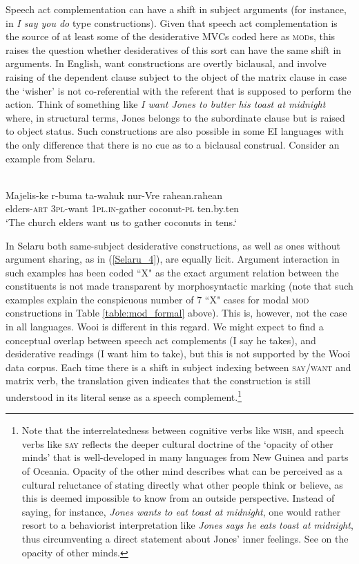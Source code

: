 Speech act complementation can have a shift in subject arguments (for instance, in \textit{I say you do} type constructions). Given that speech act complementation is the source of at least some of the desiderative MVCs coded here as \textsc{mod}s, this raises the question whether desideratives of this sort can have the same shift in arguments. In English, want constructions are overtly biclausal, and involve raising of the dependent clause subject to the object of the matrix clause in case the `wisher' is not co-referential with the referent that is supposed to perform the action. Think of something like \textit{I want Jones to butter his toast at midnight} where, in structural terms, Jones belongs to the subordinate clause but is raised to object status. Such constructions are also possible in some EI languages with the only difference that there is no cue as to a biclausal construal. Consider an example from Selaru.

\ea \label{Selaru_4}
\\
\gll Majelis-ke r-buma ta-wahuk nur-Vre rahean.rahean \\
elders-\textsc{art} 3\textsc{pl}-want 1\textsc{pl}.\textsc{in}-gather coconut-\textsc{pl} ten.by.ten \\
\glft `The church elders want us to gather coconuts in tens.‘\\ 
\z

In Selaru both same-subject desiderative constructions, as well as ones without argument sharing, as in (\ref{Selaru_4}), are equally licit. Argument interaction in such examples has been coded ``X" as the exact argument relation between the constituents is not made transparent by morphosyntactic marking (note that such examples explain the conspicuous number of 7 ``X" cases for modal \textsc{mod} constructions in Table \ref{table:mod_formal} above). This is, however, not the case in all languages. Wooi is different in this regard. We might expect to find a conceptual overlap between speech act complements (I say he takes), and desiderative readings (I want him to take), but this is not supported by the Wooi data corpus. Each time there is a shift in subject indexing between \textsc{say}/\textsc{want} and matrix verb, the translation given indicates that the construction is still understood in its literal sense as a speech complement.\footnote{Note that the interrelatedness between cognitive verbs like \textsc{wish}, and speech verbs like \textsc{say} reflects the deeper cultural doctrine of the `opacity of other minds' that is well-developed in many languages from New Guinea and parts of Oceania. Opacity of the other mind describes what can be perceived as a cultural reluctance of stating directly what other people think or believe, as this is deemed impossible to know from an outside perspective. Instead of saying, for instance, \textit{Jones wants to eat toast at midnight}, one would rather resort to a behaviorist interpretation \citep{robbins2008not} like \textit{Jones says he eats toast at midnight}, thus circumventing a direct statement about Jones' inner feelings. See \citet{robbins2008introduction, robbins2008not, rumsey2013intersubjectivity} on the opacity of other minds.}

